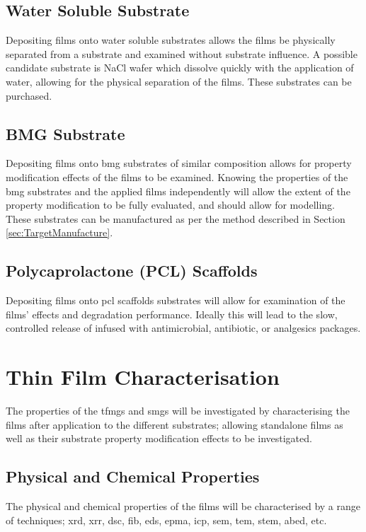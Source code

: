 \documentclass[a4paper,12pt,oneside]{report}%
\begin{document}
\subsection{Water Soluble Substrate} 
Depositing films onto water soluble substrates allows the films be physically separated from a substrate and examined without substrate influence. A possible candidate substrate is NaCl wafer which dissolve quickly with the application of water, allowing for the physical separation of the films. These substrates can be purchased. 

\subsection{BMG Substrate}
Depositing films onto \gls{bmg} substrates of similar composition allows for property modification effects of the films to be examined. Knowing the properties of the \gls{bmg} substrates and the applied films independently will allow the extent of the property modification to be fully evaluated, and should allow for modelling. These substrates can be manufactured as per the method described in Section \ref{sec:TargetManufacture}. 

\subsection{Polycaprolactone (PCL) Scaffolds}
Depositing films onto \gls{pcl} scaffolds substrates will allow for examination of the films' effects and degradation performance. Ideally this will lead to the slow, controlled release of infused with antimicrobial, antibiotic, or analgesics packages.

\section{Thin Film Characterisation}
The properties of the \glspl{tfmg} and \glspl{smg} will be investigated by characterising the films after application to the different substrates; allowing standalone films as well as their substrate property modification effects to be investigated. 

\subsection{Physical and Chemical Properties}
The physical and chemical properties of the films will be characterised by a range of techniques; \acrshort{xrd}, \acrshort{xrr}, \acrshort{dsc}, \acrshort{fib}, \acrshort{eds}, \acrshort{epma}, \acrshort{icp}, \acrshort{sem}, \acrshort{tem}, \acrshort{stem}, \acrshort{abed}, etc. 
\end{document}
